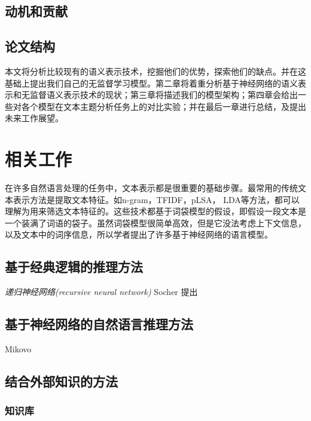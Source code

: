 \documentclass[UTF8,11pt,a4paper,nofonts]{ctexart}
\begin{document}

\subsection{动机和贡献}

\subsection{论文结构}
本文将分析比较现有的语义表示技术，挖掘他们的优势，探索他们的缺点。并在这基础上提出我们自己的无监督学习模型。第二章将着重分析基于神经网络的语义表示和无监督语义表示技术的现状；第三章将描述我们的模型架构；第四章会给出一些对各个模型在文本主题分析任务上的对比实验；并在最后一章进行总结，及提出未来工作展望。


\section{相关工作}

在许多自然语言处理的任务中，文本表示都是很重要的基础步骤。最常用的传统文本表示方法是提取文本特征。如n-gram\cite{Lin2003Automatic}，TFIDF\cite{Soucy2005Beyond}，pLSA\cite{Hofmann2001Unsupervised}，
LDA\cite{Blei2003Latent}等方法，都可以理解为用来筛选文本特征的。这些技术都基于词袋模型的假设，即假设一段文本是一个装满了词语的袋子。虽然词袋模型很简单高效，但是它没法考虑上下文信息，以及文本中的词序信息，所以学者提出了许多基于神经网络的语言模型。

\subsection{基于经典逻辑的推理方法}

\textit{递归神经网络(recursive neural network)} Socher \cite{socher2013recursive} 提出

\subsection{基于神经网络的自然语言推理方法}
Mikovo
\subsection{结合外部知识的方法}

\subsubsection{知识库}
\end{document}
